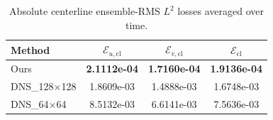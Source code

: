\begin{table}[t]
\centering
\caption{Absolute centerline ensemble-RMS $L^2$ losses averaged over time.}
\label{tab:centerline_abs_ensemble_rms_l2_loss}
\begin{tabular}{lccc}
\toprule
Method & $\mathcal{E}_{u,\mathrm{cl}}$ & $\mathcal{E}_{v,\mathrm{cl}}$ & $\mathcal{E}_{\mathrm{cl}}$ \\
\midrule
Ours & \textbf{2.1112e-04} & \textbf{1.7160e-04} & \textbf{1.9136e-04} \\
DNS\_128$\times$128 & 1.8609e-03 & 1.4888e-03 & 1.6748e-03 \\
DNS\_64$\times$64 & 8.5132e-03 & 6.6141e-03 & 7.5636e-03 \\
\bottomrule
\end{tabular}
\end{table}